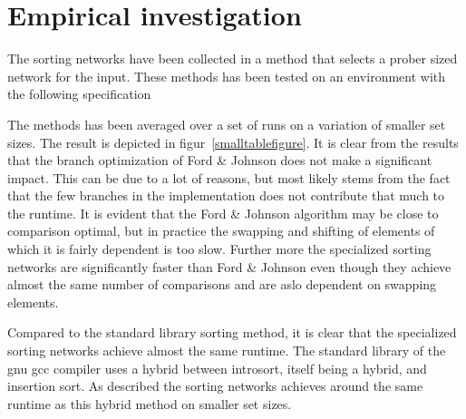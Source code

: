 \section{Empirical investigation}
The sorting networks have been collected in a method that selects a prober sized network for the input. These methods has been tested on an environment with the following specification


The methods has been averaged over a set of runs on a variation of smaller set sizes. The result is depicted in figur~\ref{smalltablefigure}. It is clear from the results that the branch optimization of Ford \& Johnson does not make a significant impact. This can be due to a lot of reasons, but most likely stems from the fact that the few branches in the implementation does not contribute that much to the runtime. It is evident that the Ford \& Johnson algorithm may be close to comparison optimal, but in practice the swapping and shifting of elements of which it is fairly dependent is too slow. Further more the specialized sorting networks are significantly faster than Ford \& Johnson even though they achieve almost the same number of comparisons and are aslo dependent on swapping elements.

Compared to the standard library sorting method, it is clear that the specialized sorting networks achieve almost the same runtime. The standard library of the gnu gcc compiler uses a hybrid between introsort, itself being a hybrid, and insertion sort\cite{gnustd}. As described the sorting networks achieves around the same runtime as this hybrid method on smaller set sizes.

